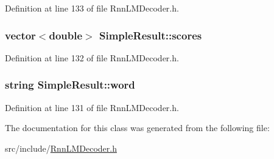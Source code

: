Definition at line 133 of file Rnn\+L\+M\+Decoder.\+h.

\subsubsection[{scores}]{\setlength{\rightskip}{0pt plus 5cm}vector$<$double$>$ Simple\+Result\+::scores}\hypertarget{class_simple_result_a31ab770eb57157cefc90bb0d2c06f2fd}{}\label{class_simple_result_a31ab770eb57157cefc90bb0d2c06f2fd}


Definition at line 132 of file Rnn\+L\+M\+Decoder.\+h.

\subsubsection[{word}]{\setlength{\rightskip}{0pt plus 5cm}string Simple\+Result\+::word}\hypertarget{class_simple_result_a75237d0ce77e05c035957c133589709d}{}\label{class_simple_result_a75237d0ce77e05c035957c133589709d}


Definition at line 131 of file Rnn\+L\+M\+Decoder.\+h.



The documentation for this class was generated from the following file\+:\begin{DoxyCompactItemize}
\item 
src/include/\hyperlink{_rnn_l_m_decoder_8h}{Rnn\+L\+M\+Decoder.\+h}\end{DoxyCompactItemize}
